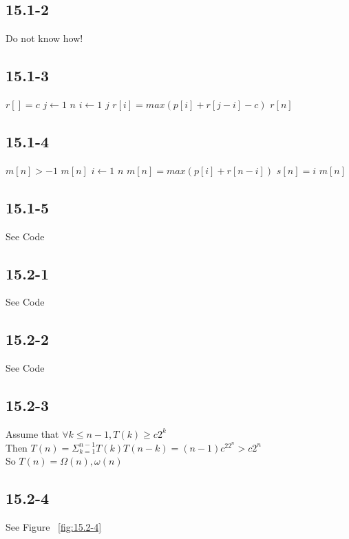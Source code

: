 \documentclass[]{article}
\begin{document}
\subsection{15.1-2}
Do not know how!

\subsection{15.1-3}
\begin{codebox}
	\li $r[] = c$
	\li  \For $j \gets 1$ \To $n$
	\li    \Do \For $i \gets 1$ \To $j$ 
	\li 		\Do $r[i] = max (p[i] + r[j-i] - c)$
	\End
	\End
	\li \Return $r[n]$
\end{codebox}

\subsection{15.1-4}
\begin{codebox}
	\li \If $m[n] > -1$ 
	\li 	\Then \Return $m[n]$ \End
	\li  \Else
	\li   \Then \For $i \gets 1$ \To $n$ 
	\li     \Do $m[n] = max (p[i] + r[n-i])$
	\li 	$s[n] = i$ \End
	\li \Return $m[n]$
\end{codebox}

\subsection{15.1-5}
See Code

\subsection{15.2-1}
See Code

\subsection{15.2-2}
See Code

\subsection{15.2-3}

Assume that $\forall k \le n-1, T(k) \ge c2^k$\\
Then $T(n) = \Sigma_{k = 1}^{n-1} T(k)T(n-k) = (n-1)c^22^n > c2^n$\\
So $T(n) = \Omega (n), \omega(n)$

\subsection{15.2-4}
See Figure ~\ref{fig:15.2-4}
\end{document}
